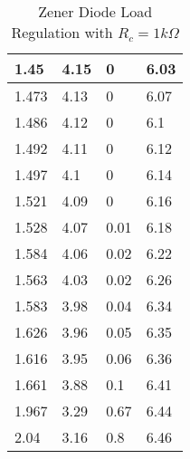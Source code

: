 \documentclass{scrartcl}
\newcommand{\1}{\mathbbm{1}}
\begin{document}
\begin{itemize}
\begin{table}[!htb]
\begin{minipage}{.5\linewidth}
\begin{tabular}{|l|l|l|l|}
        1.45 & 4.15 & 0 & 6.03 \\ \hline
        1.473 & 4.13 & 0 & 6.07 \\ \hline
        1.486 & 4.12 & 0 & 6.1 \\ \hline
        1.492 & 4.11 & 0 & 6.12 \\ \hline
        1.497 & 4.1 & 0 & 6.14 \\ \hline
        1.521 & 4.09 & 0 & 6.16 \\ \hline
        1.528 & 4.07 & 0.01 & 6.18 \\ \hline
        1.584 & 4.06 & 0.02 & 6.22 \\ \hline
        1.563 & 4.03 & 0.02 & 6.26 \\ \hline
        1.583 & 3.98 & 0.04 & 6.34 \\ \hline
        1.626 & 3.96 & 0.05 & 6.35 \\ \hline
        1.616 & 3.95 & 0.06 & 6.36 \\ \hline
        1.661 & 3.88 & 0.1 & 6.41 \\ \hline
        1.967 & 3.29 & 0.67 & 6.44 \\ \hline
        2.04 & 3.16 & 0.8 & 6.46 \\ \hline
    \end{tabular}
    \caption{Zener Diode Load Regulation with $R_c = 1 k\Omega$}
	\label{tab:ZDload1ohm}
    \end{minipage} 
\end{table}







\end{itemize}
\end{document}
